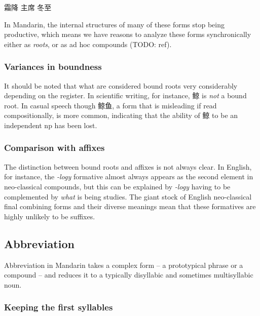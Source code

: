 \documentclass[UTF8, a4paper, oneside, scheme=plain, 12pt]{ctexrep}
\newcommand{\form}[1]{\emph{#1}}
\begin{document}
\begin{exe}
    \ex\label{ex:nouns.complex-noun.dephrasal.1} \begin{xlist}
        \ex 霜降
        \ex\label{ex:nouns.complex-noun.dephrasal.1.b} 主席
        \ex\label{ex:nouns.complex-noun.dephrasal.1.c} 冬至
    \end{xlist}
\end{exe}

In Mandarin, the internal structures of many of these forms stop being productive,
which means we have reasons to analyze these forms synchronically either as \emph{roots},
or as ad hoc compounds (TODO: ref).

\subsubsection{Variances in boundness}

It should be noted that what are considered bound roots very considerably depending on the register.
In scientific writing, for instance, 鲸 is \emph{not} a bound root.
In casual speech though 鲸鱼, a form that is misleading if read compositionally, is more common,
indicating that the ability of 鲸 to be an independent \ac{np} has been lost.

\subsubsection{Comparison with affixes}

The distinction between bound roots and affixes is not always clear.
In English, for instance, the \form{-logy} formative almost always appears
as the second element in neo-classical compounds,
but this can be explained by \form{-logy} having to be complemented by \emph{what} is being studies.
The giant stock of English neo-classical final combining forms
and their diverse meanings mean that these formatives are highly unlikely to be suffixes.


\subsection{Abbreviation}\label{sec:nouns.complex-nouns.abbreviation}

Abbreviation in Mandarin takes a complex form -- a prototypical phrase or a compound --
and reduces it to a typically disyllabic and sometimes multisyllabic noun.

\subsubsection{Keeping the first syllables}
\end{document}
